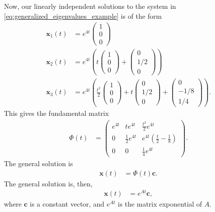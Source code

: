\documentclass[10pt]{mypackage}
\begin{document}
\begin{example}
  Now, our linearly independent solutions to the system in \eqref{eq:generalized_eigenvalues_example} is of the form
  \begin{align*}
    \mathbf{x}_1(t) &= e^{4t} \begin{pmatrix}1\\0\\0\end{pmatrix}\\
    \mathbf{x}_2(t) &= e^{4t} \left( t\begin{pmatrix}1\\0\\0\end{pmatrix} + \begin{pmatrix}0\\1/2\\0\end{pmatrix} \right)\\
    \mathbf{x}_3 (t) &= e^{4t} \left( \frac{t^2}{2} \begin{pmatrix}1\\0\\0\end{pmatrix} + t \begin{pmatrix}0\\1/2\\0\end{pmatrix} + \begin{pmatrix}0\\-1/8\\1/4\end{pmatrix} \right).
  \end{align*}
  This gives the fundamental matrix
  \begin{align*}
    \Phi(t) &= \begin{pmatrix}e^{4t} & te^{4t} & \frac{t^2}{2}e^{4t} \\ 0 & \frac{1}{2}e^{4t} & e^{4t}\left( \frac{t}{2} - \frac{1}{8} \right) \\ 0 & 0 & \frac{1}{4}e^{4t}\end{pmatrix}.
  \end{align*}
  The general solution is
  \begin{align*}
    \mathbf{x}(t) &= \Phi(t) \mathbf{c}.
  \end{align*}
  The general solution is, then,
  \begin{align*}
    \mathbf{x}(t) &= e^{At}\mathbf{c},
  \end{align*}
  where $\mathbf{c}$ is a constant vector, and $e^{At}$ is the matrix exponential of $A$.
\end{example}
\end{document}
